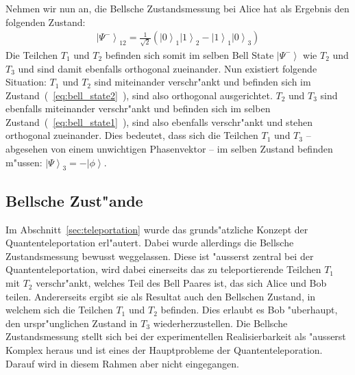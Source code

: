 \begin{refsection}
Nehmen wir nun an, die Bellsche Zustandsmessung bei Alice hat als Ergebnis den folgenden Zustand:
\begin{align}\label{eq:bell_state2}
\left|\Psi^{-}\right\rangle_{12} = \frac{1}{\sqrt{2}} ( \left|0\right\rangle_{1}\left|1\right\rangle_{2} - \left|1\right\rangle_{1}\left|0\right\rangle_{3} )
\end{align}
Die Teilchen $T_{1}$ und $T_{2}$ befinden sich somit im selben Bell State $\left| \Psi^{-} \right \rangle$ wie $T_{2}$ und $T_{3}$ und sind damit ebenfalls orthogonal zueinander. Nun existiert folgende Situation: $T_{1}$ und $T_{2}$ sind miteinander verschr"ankt und befinden sich im Zustand~(~\ref{eq:bell_state2}~), sind also orthogonal ausgerichtet. $T_{2}$ und $T_{3}$ sind ebenfalls miteinander verschr"ankt und befinden sich im selben Zustand~(~\ref{eq:bell_state1}~), sind also ebenfalls verschr"ankt und stehen orthogonal zueinander. Dies bedeutet, dass sich die Teilchen $T_{1}$ und $T_{3}$ -- abgesehen von einem unwichtigen Phasenvektor -- im selben Zustand befinden m"ussen: $\left| \Psi\right\rangle_{3} = -\left|\phi\right\rangle$.

\subsection{Bellsche Zust"ande}\label{sec:bell-states}

Im Abschnitt~\ref{sec:teleportation} wurde das grunds"atzliche Konzept der Quantenteleportation erl"autert. Dabei wurde allerdings die Bellsche Zustandsmessung bewusst weggelassen. Diese ist "ausserst zentral bei der Quantenteleportation, wird dabei einerseits das zu teleportierende Teilchen $T_{1}$ mit $T_{2}$ verschr"ankt, welches Teil des Bell Paares ist, das sich Alice und Bob teilen. Andererseits ergibt sie als Resultat auch den Bellschen Zustand, in welchem sich die Teilchen $T_{1}$ und $T_{2}$ befinden. Dies erlaubt es Bob "uberhaupt, den urspr"unglichen Zustand in $T_{3}$ wiederherzustellen. Die Bellsche Zustandsmessung stellt sich bei der experimentellen Realisierbarkeit als "ausserst Komplex heraus und ist eines der Hauptprobleme der Quantenteleporation. Darauf wird in diesem Rahmen aber nicht eingegangen.


\end{refsection}
